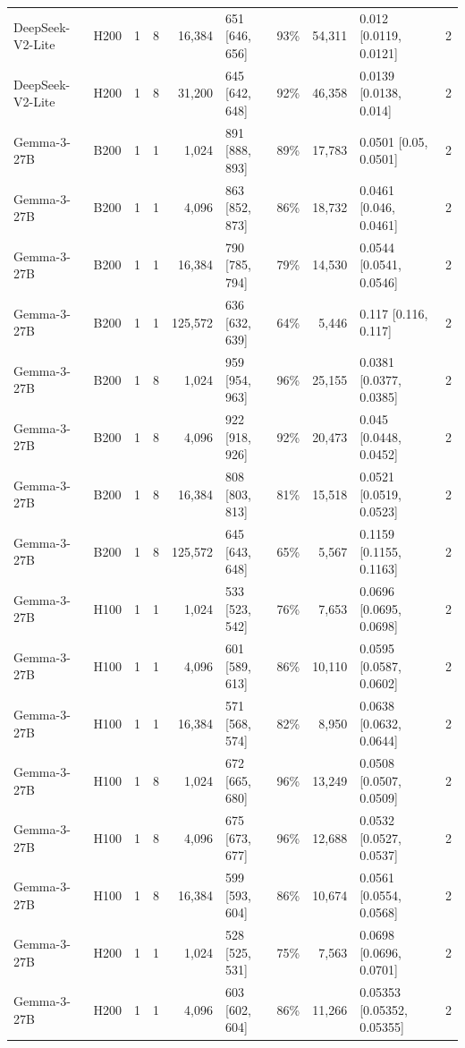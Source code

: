 \begin{landscape}
\begin{longtable}{llrrrlrrlr}
DeepSeek-V2-Lite & H200 & 1 & 8 & 16,384 & 651 {[}646, 656{]} & 93\% & 54,311 & 0.012 {[}0.0119, 0.0121{]} & 2 \\
DeepSeek-V2-Lite & H200 & 1 & 8 & 31,200 & 645 {[}642, 648{]} & 92\% & 46,358 & 0.0139 {[}0.0138, 0.014{]} & 2 \\
Gemma-3-27B & B200 & 1 & 1 & 1,024 & 891 {[}888, 893{]} & 89\% & 17,783 & 0.0501 {[}0.05, 0.0501{]} & 2 \\
Gemma-3-27B & B200 & 1 & 1 & 4,096 & 863 {[}852, 873{]} & 86\% & 18,732 & 0.0461 {[}0.046, 0.0461{]} & 2 \\
Gemma-3-27B & B200 & 1 & 1 & 16,384 & 790 {[}785, 794{]} & 79\% & 14,530 & 0.0544 {[}0.0541, 0.0546{]} & 2 \\
Gemma-3-27B & B200 & 1 & 1 & 125,572 & 636 {[}632, 639{]} & 64\% & 5,446 & 0.117 {[}0.116, 0.117{]} & 2 \\
Gemma-3-27B & B200 & 1 & 8 & 1,024 & 959 {[}954, 963{]} & 96\% & 25,155 & 0.0381 {[}0.0377, 0.0385{]} & 2 \\
Gemma-3-27B & B200 & 1 & 8 & 4,096 & 922 {[}918, 926{]} & 92\% & 20,473 & 0.045 {[}0.0448, 0.0452{]} & 2 \\
Gemma-3-27B & B200 & 1 & 8 & 16,384 & 808 {[}803, 813{]} & 81\% & 15,518 & 0.0521 {[}0.0519, 0.0523{]} & 2 \\
Gemma-3-27B & B200 & 1 & 8 & 125,572 & 645 {[}643, 648{]} & 65\% & 5,567 & 0.1159 {[}0.1155, 0.1163{]} & 2 \\
Gemma-3-27B & H100 & 1 & 1 & 1,024 & 533 {[}523, 542{]} & 76\% & 7,653 & 0.0696 {[}0.0695, 0.0698{]} & 2 \\
Gemma-3-27B & H100 & 1 & 1 & 4,096 & 601 {[}589, 613{]} & 86\% & 10,110 & 0.0595 {[}0.0587, 0.0602{]} & 2 \\
Gemma-3-27B & H100 & 1 & 1 & 16,384 & 571 {[}568, 574{]} & 82\% & 8,950 & 0.0638 {[}0.0632, 0.0644{]} & 2 \\
Gemma-3-27B & H100 & 1 & 8 & 1,024 & 672 {[}665, 680{]} & 96\% & 13,249 & 0.0508 {[}0.0507, 0.0509{]} & 2 \\
Gemma-3-27B & H100 & 1 & 8 & 4,096 & 675 {[}673, 677{]} & 96\% & 12,688 & 0.0532 {[}0.0527, 0.0537{]} & 2 \\
Gemma-3-27B & H100 & 1 & 8 & 16,384 & 599 {[}593, 604{]} & 86\% & 10,674 & 0.0561 {[}0.0554, 0.0568{]} & 2 \\
Gemma-3-27B & H200 & 1 & 1 & 1,024 & 528 {[}525, 531{]} & 75\% & 7,563 & 0.0698 {[}0.0696, 0.0701{]} & 2 \\
Gemma-3-27B & H200 & 1 & 1 & 4,096 & 603 {[}602, 604{]} & 86\% & 11,266 & 0.05353 {[}0.05352, 0.05355{]} & 2 \\

\end{longtable}
\end{landscape}

